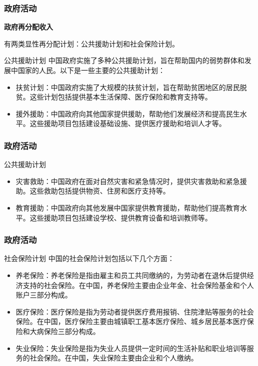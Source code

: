 \documentclass[aspectratio=169, 12pt]{beamer}
\begin{document}
\begin{frame}[plain]
    \frametitle{政府活动}
    \textbf{政府再分配收入}\par
       有两类显性再分配计划：公共援助计划和社会保险计划。
    \begin{block}{公共援助计划}
        中国政府实施了多种公共援助计划，旨在帮助国内的弱势群体和发展中国家的人民。以下是一些主要的公共援助计划：
        \begin{itemize}
        \item 扶贫计划：中国政府实施了大规模的扶贫计划，旨在帮助贫困地区的居民脱贫。这些计划包括提供基本生活保障、医疗保险和教育支持等。

        \item 援外援助：中国政府向其他国家提供援助，帮助他们发展经济和提高民生水平。这些援助项目包括建设基础设施、提供医疗援助和培训人才等。
        \end{itemize}
    \end{block}
\end{frame}

\begin{frame}[plain]
    \frametitle{政府活动}
    \begin{block}{公共援助计划}
        \begin{itemize}
        \item 灾害救助：中国政府在面对自然灾害和紧急情况时，提供灾害救助和紧急援助。这些救助包括提供物资、住房和医疗支持等。

        \item 教育援助：中国政府向其他发展中国家提供教育援助，帮助他们提高教育水平。这些援助项目包括建设学校、提供教育设备和培训教师等。
        \end{itemize}
    \end{block}
\end{frame}

\begin{frame}[plain]
    \frametitle{政府活动}
    \begin{block}{社会保险计划}
        中国的社会保险计划包括以下几个方面：
        \begin{itemize}
            \item 养老保险：养老保险是指由雇主和员工共同缴纳的，为劳动者在退休后提供经济支持的社会保险。在中国，养老保险主要由企业年金、社会保险基金和个人账户三部分构成。
            \item 医疗保险：医疗保险是指为劳动者提供医疗费用报销、住院津贴等服务的社会保险。在中国，医疗保险主要由城镇职工基本医疗保险、城乡居民基本医疗保险和大病保险三部分构成。
            \item 失业保险：失业保险是指为失业人员提供一定时间的生活补贴和职业培训等服务的社会保险。在中国，失业保险主要由企业和个人缴纳。
        \end{itemize}
    \end{block}
\end{frame}
\end{document}
